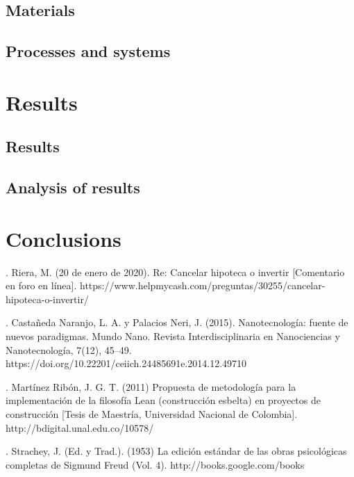 \documentclass[a4paper,12pt]{article}
\begin{document}
\subsection{Materials}
    \blindtext

\subsection{Processes and systems}
    \lipsum[2-10]

\section{\Large{Results}}
\subsection{Results}
    \blindtext
    
\subsection{Analysis of results}
    \lipsum[1-17]

\section{\Large{Conclusions}}
    \lipsum[1-4]

\begin{thebibliography}{}
\bibitem{}. Riera, M. (20 de enero de 2020). Re: Cancelar hipoteca o invertir [Comentario en foro en línea]. https://www.helpmycash.com/preguntas/30255/cancelar-hipoteca-o-invertir/


\bibitem{}. Castañeda Naranjo, L. A. y Palacios Neri, J. (2015). Nanotecnología: fuente de nuevos paradigmas. Mundo Nano. Revista Interdisciplinaria en Nanociencias y Nanotecnología, 7(12), 45–49. https://doi.org/10.22201/ceiich.24485691e.2014.12.49710

\bibitem{}. Martínez Ribón, J. G. T. (2011) Propuesta de metodología para la implementación de la filosofía Lean (construcción esbelta) en proyectos de construcción [Tesis de Maestría, Universidad Nacional de Colombia]. http://bdigital.unal.edu.co/10578/

\bibitem{}. Strachey, J. (Ed. y Trad.). (1953) La edición estándar de las obras psicológicas completas de Sigmund Freud (Vol. 4). http://books.google.com/books
\end{thebibliography}
\end{document}
